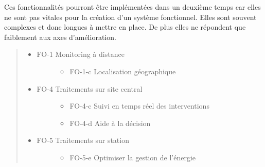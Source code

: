 \documentclass[a4paper,12pt]{article}
\begin{document}
Ces fonctionnalités pourront être implémentées dans un deuxième temps car elles ne sont pas vitales pour la création d'un système fonctionnel. Elles sont souvent complexes et donc longues à mettre en place. De plus elles ne répondent que faiblement aux axes d'amélioration.
%
\begin{quote}
%
\begin{itemize}

\item %
\begin{description}
\item[{FO-1 Monitoring à distance}] \leavevmode %
\begin{itemize}

\item FO-1-c Localisation géographique

\end{itemize}

\end{description}

\item %
\begin{description}
\item[{FO-4 Traitements sur site central}] \leavevmode %
\begin{itemize}

\item FO-4-c Suivi en temps réel des interventions

\item FO-4-d Aide à la décision

\end{itemize}

\end{description}

\item %
\begin{description}
\item[{FO-5 Traitements sur station}] \leavevmode %
\begin{itemize}

\item FO-5-e Optimiser la gestion de l'énergie

\end{itemize}

\end{description}

\end{itemize}

\end{quote}


\end{document}
